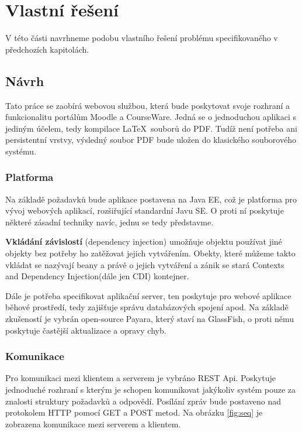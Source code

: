\chapter{Vlastní řešení}  

V této části navrhneme podobu vlastního řešení problému specifikovaného v předchozích kapitolách. 

\section{Návrh}

Tato práce se zaobírá webovou službou, která bude poskytovat svoje rozhraní a funkcionalitu portálům Moodle a CourseWare. Jedná se o jednoduchou aplikaci s jediným účelem, tedy kompilace \LaTeX\ souborů do PDF. Tudíž není potřeba ani persistentní vrstvy, výsledný soubor PDF bude uložen do klasického souborového systému. 

\subsection{Platforma}
Na základě požadavků bude aplikace postavena na Java EE, což je platforma pro vývoj webových aplikací, rozšiřující standardní Javu SE. O proti ní poskytuje některé zásadní techniky navíc, jednu se tedy představme. 
\par
\textbf{Vkládání závislostí} (dependency injection) umožňuje objektu používat jiné objekty bez potřeby ho zatěžovat jejich vytvářením. Obekty, které můžeme takto vkládat se nazývají beany a právě o jejich vytváření a zánik se stará Contexts and Dependency Injection(dále jen CDI) kontejner.
\\[12pt]
\par
Dále je potřeba specifikovat aplikační server, ten poskytuje pro webové aplikace běhové prostředí, tedy zajišťuje správu databázových spojení apod. Na základě zkušeností je vybrán open-source Payara, který staví na GlassFish, o proti němu poskytuje častější aktualizace a opravy chyb. 

\subsection{Komunikace}
Pro komunikaci mezi klientem a serverem je vybráno REST Api. Poskytuje jednoduché rozhraní s kterým je schopen komunikovat jakýkoliv systém pouze za znalosti struktury požadavků a odpovědí. Posílání zpráv bude postaveno nad protokolem HTTP pomocí GET a POST metod. Na obrázku \ref{fig:seq} je zobrazena komunikace mezi serverem a klientem. 

